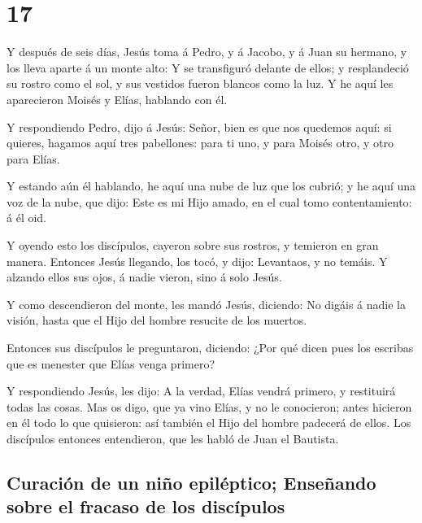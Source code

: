 \hypertarget{section-40-17}{%
\section{17}\label{section-40-17}}

 Y después de seis días, Jesús toma á Pedro, y á Jacobo, y
á Juan su hermano, y los lleva aparte á un monte alto:  Y
se transfiguró delante de ellos; y resplandeció su rostro como el sol, y
sus vestidos fueron blancos como la luz.  Y he aquí les
aparecieron Moisés y Elías, hablando con él.

 Y respondiendo Pedro, dijo á Jesús: Señor, bien es que
nos quedemos aquí: si quieres, hagamos aquí tres pabellones: para ti
uno, y para Moisés otro, y otro para Elías.

 Y estando aún él hablando, he aquí una nube de luz que
los cubrió; y he aquí una voz de la nube, que dijo: Este es mi Hijo
amado, en el cual tomo contentamiento: á él oid.

 Y oyendo esto los discípulos, cayeron sobre sus rostros,
y temieron en gran manera.  Entonces Jesús llegando, los
tocó, y dijo: Levantaos, y no temáis.  Y alzando ellos sus
ojos, á nadie vieron, sino á solo Jesús.

 Y como descendieron del monte, les mandó Jesús, diciendo:
No digáis á nadie la visión, hasta que el Hijo del hombre resucite de
los muertos.

 Entonces sus discípulos le preguntaron, diciendo: ¿Por
qué dicen pues los escribas que es menester que Elías venga primero?

 Y respondiendo Jesús, les dijo: A la verdad, Elías
vendrá primero, y restituirá todas las cosas.  Mas os
digo, que ya vino Elías, y no le conocieron; antes hicieron en él todo
lo que quisieron: así también el Hijo del hombre padecerá de ellos.
 Los discípulos entonces entendieron, que les habló de
Juan el Bautista.

\hypertarget{curaciuxf3n-de-un-niuxf1o-epiluxe9ptico-enseuxf1ando-sobre-el-fracaso-de-los-discuxedpulos}{%
\subsection{Curación de un niño epiléptico; Enseñando sobre el fracaso
de los
discípulos}\label{curaciuxf3n-de-un-niuxf1o-epiluxe9ptico-enseuxf1ando-sobre-el-fracaso-de-los-discuxedpulos}}


